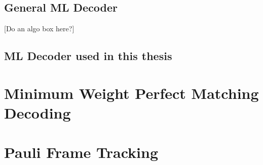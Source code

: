\subsection{General ML Decoder}

[Do an algo box here?]



\subsection{ML Decoder used in this thesis}


\section{Minimum Weight Perfect Matching Decoding}\label{sec:MWPM_decoding}


\section{Pauli Frame Tracking}